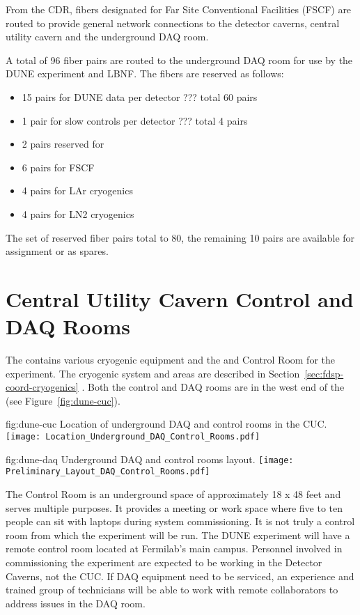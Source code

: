 From the CDR, fibers designated for Far Site Conventional Facilities (FSCF) are routed to provide general network connections to the detector caverns, central utility cavern and the underground DAQ room.

A total of 96 fiber pairs are routed to the underground DAQ room for use by the DUNE experiment and LBNF. The fibers are reserved as follows:
\begin{itemize}
\item
15 pairs for DUNE data per detector ??? total 60 pairs
\item
1 pair for slow controls per detector ??? total 4 pairs
\item
2 pairs reserved for 
\item
6 pairs for FSCF
\item
4 pairs for LAr cryogenics
\item
4 pairs for LN2 cryogenics
\end{itemize}

The set of reserved fiber pairs total to 80, the remaining 10 pairs are available for assignment or as spares.


\section{Central Utility Cavern Control and DAQ Rooms}
\label{sec:fdsp-coord-cuc-daq}

The  contains various cryogenic equipment and the  and Control
Room for the  experiment.  The cryogenic system and areas are described in Section~\ref{sec:fdsp-coord-cryogenics} . Both the control and DAQ rooms are in the west
end of the  (see Figure~\ref{fig:dune-cuc}).  
\begin{dunefigure}{fig:dune-cuc}
  {Location of underground DAQ and control rooms in the CUC.}
  \texttt{[image: Location\_Underground\_DAQ\_Control\_Rooms.pdf]}
\end{dunefigure}

\begin{dunefigure}{fig:dune-daq}
  {Underground DAQ and control rooms layout.}
  \texttt{[image: Preliminary\_Layout\_DAQ\_Control\_Rooms.pdf]}
\end{dunefigure}


The Control Room is an underground space of approximately 18 x 48 feet and serves multiple purposes.   It provides a meeting or work space where
five to ten people can sit with laptops during system commissioning.
It is not truly a control room from which the
experiment will be run.  The DUNE experiment will have a remote control room located at Fermilab's main campus.  Personnel involved in commissioning the experiment are expected to be working in the Detector Caverns, not the CUC.  If DAQ equipment need to be serviced, an experience and trained group of technicians will be able to work with remote collaborators to address issues in the DAQ room.

